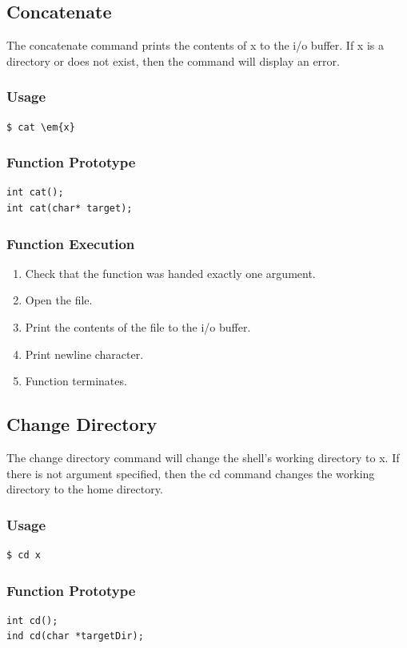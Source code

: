 \documentclass[12pt,letterpaper]{article}
\begin{document}
\subsection{Concatenate}
The concatenate command prints the contents of x to the i/o buffer.  If x is a directory or does not exist, then the command will display an error.
\subsubsection{Usage}
\begin{verbatim}
$ cat \em{x}
\end{verbatim}
\subsubsection{Function Prototype}
\begin{verbatim}
int cat();
int cat(char* target);
\end{verbatim}
\subsubsection{Function Execution}
\begin{enumerate}
\item Check that the function was handed exactly one argument.
\item Open the file.
\item Print the contents of the file to the i/o buffer.
\item Print newline character.
\item Function terminates.
\end{enumerate}

\subsection{Change Directory}
The change directory command will change the shell's working directory to x. If there is not argument specified, then the cd command changes the working directory to the home directory.
\subsubsection{Usage}
\begin{verbatim}
$ cd x
\end{verbatim}
\subsubsection{Function Prototype}
\begin{verbatim}
int cd();
ind cd(char *targetDir);
\end{verbatim}
\end{document}
